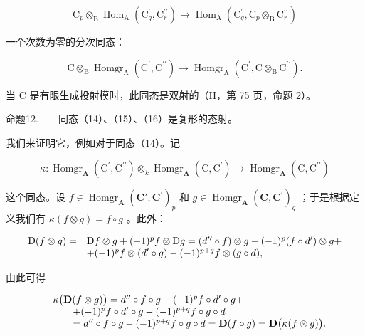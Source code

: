 \[
\mathrm{C} _ {p} \otimes_ {\mathrm{B}} \operatorname{Hom} _ {\mathrm{A}} \left(\mathrm{C} _ {q} ^ {\prime}, \mathrm{C} _ {r} ^ {\prime \prime}\right)\rightarrow \operatorname{Hom} _ {\mathrm{A}} \left(\mathrm{C} _ {q} ^ {\prime}, \mathrm{C} _ {p} \otimes_ {\mathrm{B}} \mathrm{C} _ {r} ^ {\prime \prime}\right)
\]

一个次数为零的分次同态：

\[
\mathrm{C} \otimes_ {\mathrm{B}} \operatorname{Homgr} _ {\mathrm{A}} \left(\mathrm{C} ^ {\prime}, \mathrm{C} ^ {\prime \prime}\right)\rightarrow \operatorname{Homgr} _ {\mathrm{A}} \left(\mathrm{C} ^ {\prime}, \mathrm{C} \otimes_ {\mathrm{B}} \mathrm{C} ^ {\prime \prime}\right).\tag{16}
\]

当 C 是有限生成投射模时，此同态是双射的（II，第 75 页，命题 2）。

命题12.——同态（14）、（15）、（16）是复形的态射。

我们来证明它，例如对于同态（14）。记

\[
\kappa : \operatorname{Homgr} _ {\mathbf {A}} \left(\mathrm{C} ^ {\prime}, \mathrm{C} ^ {\prime \prime}\right) \otimes_ {k} \operatorname{Homgr} _ {\mathbf {A}} \left(\mathrm{C}, \mathrm{C} ^ {\prime}\right)\rightarrow \operatorname{Homgr} _ {\mathbf {A}} \left(\mathrm{C}, \mathrm{C} ^ {\prime \prime}\right)
\]

这个同态。设 \(f \in \operatorname{Homgr}_{\mathbf{A}}(\mathbf{C}', \mathbf{C}^{\prime})_{p}\) 和 \(g \in \operatorname{Homgr}_{\mathbf{A}}(\mathbf{C}, \mathbf{C}^{\prime})_{q}\) ；于是根据定义我们有 \(\kappa(f \otimes g) = f \circ g\) 。此外：

\[
\begin{array}{r l} \mathrm{D} (f \otimes g) = & \mathrm{D} f \otimes g + (- 1) ^ {p} f \otimes \mathrm{D} g = (d ^ {\prime \prime} \circ f) \otimes g - (- 1) ^ {p} (f \circ d ^ {\prime}) \otimes g + \\ & + (- 1) ^ {p} f \otimes (d ^ {\prime} \circ g) - (- 1) ^ {p + q} f \otimes (g \circ d), \end{array}
\]

由此可得

\[
\begin{array}{r l} & {\kappa \big (\mathbf {D} (f \otimes g) \big) = d ^ {\prime \prime} \circ f \circ g - (- 1) ^ {p} f \circ d ^ {\prime} \circ g +} \\ & {\qquad + (- 1) ^ {p} f \circ d ^ {\prime} \circ g - (- 1) ^ {p + q} f \circ g \circ d} \\ & {\qquad = d ^ {\prime \prime} \circ f \circ g - (- 1) ^ {p + q} f \circ g \circ d = \mathbf {D} (f \circ g) = \mathbf {D} \big (\kappa (f \otimes g) \big).} \end{array}
\]


